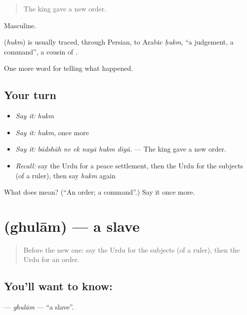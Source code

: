 \begin{quote}
The king gave a new order.
\end{quote}

Masculine.

\begin{cousinweb}
\textbf{} (\emph{hukm}) is usually traced, through Persian, to Arabic \emph{ḥukm}, \textquotedblleft{}a judgement, a command\textquotedblright{}, a cousin of \textbf{}.
\end{cousinweb}

\begin{grammarlens}[title={What you've built}]
One more word for telling what happened.
\end{grammarlens}

\subsection*{Your turn}
\begin{itemize}
\raggedright
  \item \emph{Say it:} \emph{hukm}
  \item \emph{Say it:} \emph{hukm}, once more
  \item \emph{Say it:} \emph{bādshāh ne ek nayā hukm diyā.} — The king gave a new order.
  \item \emph{Recall:} say the Urdu for a peace settlement, then the Urdu for the subjects (of a ruler), then say \emph{hukm} again
\end{itemize}

\begin{tcolorbox}[breakable,colback=teal!4,colframe=teal!35!black,title={Before you move on}]
What does  mean? (\textquotedblleft{}An order; a command\textquotedblright{}.) Say it once more.
\end{tcolorbox}
\section[\texorpdfstring{\ur{غلام} (ghulām)}{غلام (ghulām)}]{ (ghulām) — a slave}

\label{lesson:UR-C312-ghulam}



\begin{quote}
Before the new one: say the Urdu for the subjects (of a ruler), then the Urdu for an order.
\end{quote}

\subsection*{You'll want to know: }
\textbf{} — \emph{ghulām} — \textquotedblleft{}a slave\textquotedblright{}.

